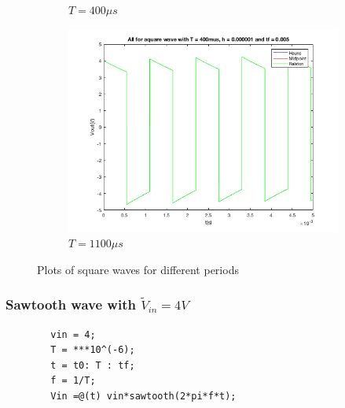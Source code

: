 \documentclass[11pt,a4paper]{article}
\begin{document}
\begin{figure}[h]
\begin{subfigure}{.5\textwidth}
          \caption{$T = 400\mu s$}
          \label{fig:sfig7}
        \end{subfigure}
        \begin{subfigure}{.5\textwidth}
          \centering
          \includegraphics[width=.8\linewidth]{Ex1_Figs/square1100.png}
          \caption{$T = 1100\mu s$}
          \label{fig:sfig8}
        \end{subfigure}
        \caption{Plots of square waves for different periods}
        \label{fig:test5}
    \end{figure}




\newpage
\FloatBarrier
\subsubsection{Sawtooth wave with $\tilde{V}_{in} = 4V$}

    \begin{verbatim}
        vin = 4;
        T = ***10^(-6);
        t = t0: T : tf;
        f = 1/T;
        Vin =@(t) vin*sawtooth(2*pi*f*t);
    \end{verbatim}
\end{document}
